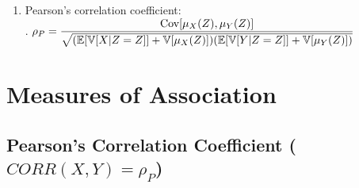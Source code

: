 \begin{enumerate}
    \item Pearson’s correlation coefficient:
    \hfill \cite{statistics/book/Statistics-for-Data-Scientists/Maurits-Kaptein}
    \\
    .\hfill
    $
        \rho_P
        = \dfrac{\text{Cov}[\mu_X (Z ), \mu_Y (Z )]}{
            \sqrt{
                (\mathbb{E}[\mathbb{V}[X |Z = Z]] + \mathbb{V}[\mu_X (Z )])
                (\mathbb{E}[\mathbb{V}[Y |Z = Z]] + \mathbb{V}[\mu_Y (Z )])
            }
        }
    $
    \hfill \cite{statistics/book/Statistics-for-Data-Scientists/Maurits-Kaptein}
\end{enumerate}



































\section{Measures of Association}


\subsection{Pearson’s Correlation Coefficient ($CORR(X, Y) = \rho_P$)}

